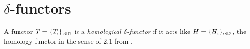 \section{\texorpdfstring{$\delta$}{δ}-functors}
A functor $T=\{T_i\}_{i\in\mathbb{N}}$ is a \emph{homological $\delta$-functor} if it acts like $H=\{H_i\}_{i\in\mathbb{N}}$, the homology functor in the sense of 2.1 from \cite{Weibel_1995}.


\newpage
